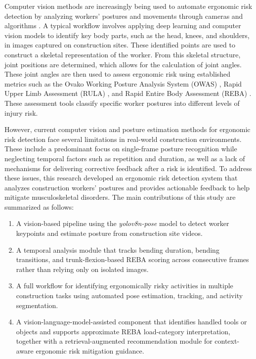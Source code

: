\documentclass[11pt]{article}
\begin{document}
Computer vision methods are increasingly being used to automate ergonomic risk detection by analyzing workers' postures and movements through cameras and algorithms \citep{seo2021automated}. A typical workflow involves applying deep learning and computer vision models to identify key body parts, such as the head, knees, and shoulders, in images captured on construction sites. These identified points are used to construct a skeletal representation of the worker. From this skeletal structure, joint positions are determined, which allows for the calculation of joint angles. These joint angles are then used to assess ergonomic risk using established metrics such as the Ovako Working Posture Analysis System (OWAS) \citep{karhu1977correcting}, Rapid Upper Limb Assessment (RULA) \citep{mcatamney1993rula}, and Rapid Entire Body Assessment (REBA) \citep{hignett2000rapid}. These assessment tools classify specific worker postures into different levels of injury risk.

However, current computer vision and posture estimation methods for ergonomic risk detection face several limitations in real-world construction environments. These include a predominant focus on single-frame posture recognition while neglecting temporal factors such as repetition and duration, as well as a lack of mechanisms for delivering corrective feedback after a risk is identified. To address these issues, this research developed an ergonomic risk detection system that analyzes construction workers' postures and provides actionable feedback to help mitigate musculoskeletal disorders. The main contributions of this study are summarized as follows:

\begin{enumerate}[nosep, leftmargin=*]
    \item A vision-based pipeline using the \textit{yolov8n-pose} model to detect worker keypoints and estimate posture from construction site videos.
    \item A temporal analysis module that tracks bending duration, bending transitions, and trunk-flexion-based REBA scoring across consecutive frames rather than relying only on isolated images.
    \item A full workflow for identifying ergonomically risky activities in multiple construction tasks using automated pose estimation, tracking, and activity segmentation.
    \item A vision-language-model-assisted component that identifies handled tools or objects and supports approximate REBA load-category interpretation, together with a retrieval-augmented recommendation module for context-aware ergonomic risk mitigation guidance.
\end{enumerate}
\end{document}
